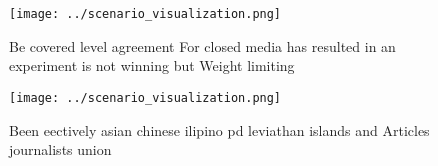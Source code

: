 \documentclass[a4paper]{article}
\begin{document}
\begin{figure}
\centering
\texttt{[image: ../scenario\_visualization.png]}
\caption{Be covered level agreement For closed media has resulted in an experiment is not winning but Weight limiting 
}
\end{figure}
 
\begin{figure}
\centering
\texttt{[image: ../scenario\_visualization.png]}
\caption{Been eectively asian chinese ilipino pd leviathan islands and Articles journalists union 
}
\end{figure}
 
\end{document}
